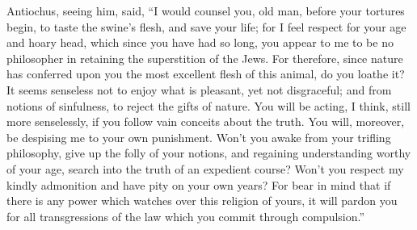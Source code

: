  Antiochus, seeing him, said,  ``I would
counsel you, old man, before your tortures begin, to taste the swine's
flesh, and save your life; for I feel respect for your age and hoary
head, which since you have had so long, you appear to me to be no
philosopher in retaining the superstition of the Jews. 
For therefore, since nature has conferred upon you the most excellent
flesh of this animal, do you loathe it?  It seems
senseless not to enjoy what is pleasant, yet not disgraceful; and from
notions of sinfulness, to reject the gifts of nature.  You
will be acting, I think, still more senselessly, if you follow vain
conceits about the truth.  You will, moreover, be
despising me to your own punishment.  Won't you awake
from your trifling philosophy, give up the folly of your notions, and
regaining understanding worthy of your age, search into the truth of an
expedient course?  Won't you respect my kindly admonition
and have pity on your own years?  For bear in mind that
if there is any power which watches over this religion of yours, it will
pardon you for all transgressions of the law which you commit through
compulsion.''

